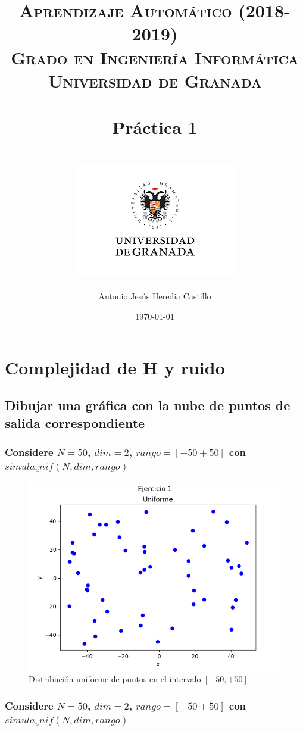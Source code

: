 \documentclass[12pt,a4paper]{article}
\title{
\normalfont \normalsize 
\textsc{{\bf Aprendizaje Automático (2018-2019)} \\ Grado en Ingeniería Informática \\ Universidad de Granada} \\ [25pt] %
\horrule{0.5pt} \\[0.4cm] %
\huge Práctica 1 \\ %
\horrule{2pt} \\[0.5cm] %
\includegraphics{images/logo.png}	
}
\author{Antonio Jesús Heredia Castillo} %
\date{\normalsize\today} %
\begin{document}
\maketitle %
\newpage %
\tableofcontents %
\listoffigures
\listoftables
\newpage

\section{Complejidad de H y ruido}
\subsection{Dibujar una gráfica con la nube de puntos de salida correspondiente}
\subsubsection{Considere $N=50$, $dim=2$, $rango=[-50+50]$ con $simula_unif(N,dim,rango)$}
\begin{figure}[H]  %
	\centering
	\includegraphics{images/uniforme.png}  
	\caption{Distribución uniforme de puntos en el intervalo $[-50,+50]$}
	\label{figura1}
\end{figure}

\subsubsection{Considere $N=50$, $dim=2$, $rango=[-50+50]$ con $simula_unif(N,dim,rango)$}
\end{document}
